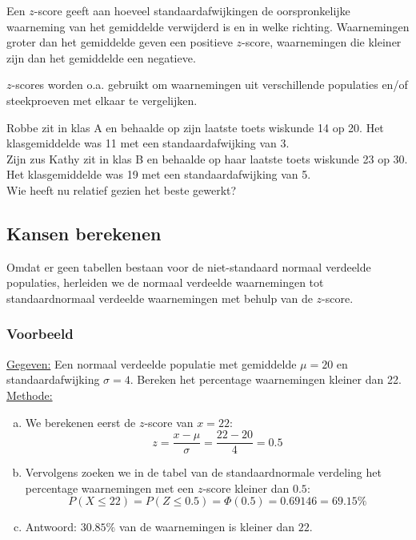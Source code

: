 \documentclass[12pt,twoside]{article}
\begin{document}
{Een $z$-score geeft aan hoeveel standaardafwijkingen de oorspronkelijke waarneming van het gemiddelde verwijderd is en in welke richting. Waarnemingen groter dan het gemiddelde geven een positieve $z$-score, waarnemingen die kleiner zijn dan het gemiddelde een negatieve.

$z$-scores worden o.a. gebruikt om waarnemingen uit verschillende populaties en/of steekproeven met elkaar te vergelijken.

\begin{oefening}
Robbe zit in klas A en behaalde op zijn laatste toets wiskunde 14 op 20. Het klasgemiddelde was 11 met een standaardafwijking van 3.\\
Zijn zus Kathy zit in klas B en behaalde op haar laatste toets wiskunde 23 op 30. Het klasgemiddelde was 19 met een standaardafwijking van 5.\\
Wie heeft nu relatief gezien het beste gewerkt?
\end{oefening}

\subsection{Kansen berekenen}

Omdat er geen tabellen bestaan voor de niet-standaard normaal verdeelde populaties, herleiden we de normaal verdeelde waarnemingen tot standaardnormaal verdeelde waarnemingen met behulp van de $z$-score.

\subsubsection*{Voorbeeld}

\underline{Gegeven:} Een normaal verdeelde populatie met gemiddelde $\mu=20$ en standaardafwijking $\sigma=4$. Bereken het percentage waarnemingen kleiner dan 22.\\
\underline{Methode:}
\begin{enumerate}[(a)]
  \item We berekenen eerst de $z$-score van $x=22$:
  $$z=\dfrac{x-\mu}{\sigma}=\dfrac{22-20}{4}=0.5$$
  \item Vervolgens zoeken we in de tabel van de standaardnormale verdeling het percentage waarnemingen met een $z$-score kleiner dan $0.5$:
  $$P(X\leq 22)=P(Z\leq 0.5)=\Phi(0.5)=0.69146=69.15\%$$
  \item Antwoord: $30.85\%$ van de waarnemingen is kleiner dan $22$.
\end{enumerate}

}
\end{document}
